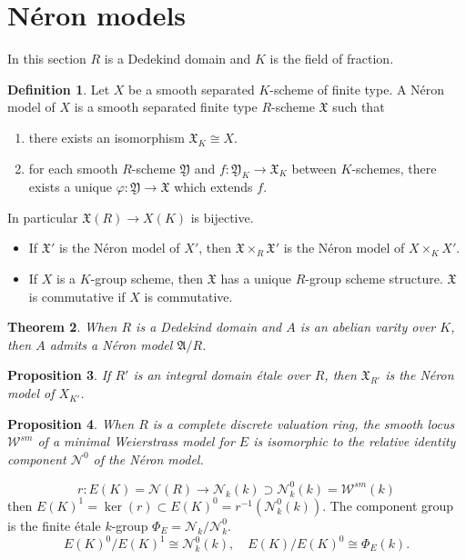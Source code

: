 \documentclass[leqno]{amsart}
\newcommand{\1}{\mathbf{1}}
\newtheorem{thm}{Theorem}[section]
\newtheorem{prop}[thm]{Proposition}
\theoremstyle{definition}
\newtheorem{defn}[thm]{Definition}
\theoremstyle{remark}
\begin{document}
\section{N\'{e}ron models}



In this  section $R$ is a Dedekind domain 
and  $K$ is the field of fraction.

\begin{defn}
	 Let $X$ be a smooth separated $K$-scheme of finite type.
	 A N\'{e}ron model of $X$ is a smooth separated finite type
	 $R$-scheme $\mathfrak{X}$ such that
	 \begin{enumerate}[label=(\alph*)]
		 \item there exists an isomorphism
			 $\mathfrak{X}_K\cong X$.
		 \item for each smooth $R$-scheme $\mathfrak{Y}$
		 and $f\colon\mathfrak{Y}_K\to \mathfrak{X}_K$
		 between  $K$-schemes, 
		 there exists a unique  
		 $\varphi\colon\mathfrak{Y}\to \mathfrak{X}$
		 which extends $f$.
	 \end{enumerate}
	 In particular $\mathfrak{X}(R)\to X(K)$
	 is bijective.
\end{defn}
\begin{itemize}
	\item If $\mathfrak{X}'$ is the N\'{e}ron model
		of $X'$, then
		$\mathfrak{X}\times_R\mathfrak{X}'$
		is the  N\'{e}ron model of $X\times_KX'$.
	\item If $X$ is a  $K$-group scheme,
		then  $\mathfrak{X}$ has a unique
		 $R$-group scheme structure.
		 $\mathfrak{X}$ is commutative if
		 $X$ is commutative.
\end{itemize}


\begin{thm}
	When $R$ is a Dedekind domain
	and  $A$ is an abelian varity over  $K$,
	then  $A$ admits a  N\'{e}ron model $\mathfrak{A}/R$.
\end{thm}

\begin{prop}
	If $R'$ is an integral domain \'{e}tale over $R$,
	then  $\mathfrak{X}_{R'}$ 
	is the N\'{e}ron model of $X_{K'}$.
\end{prop}

\begin{prop}
	When $R$ is a complete discrete valuation ring,
	the smooth locus  $\mathcal{W}^{sm}$ 
	of a minimal Weierstrass model for $E$
	is isomorphic to the relative identity component 
	$\mathcal{N}^0$ of the  N\'{e}ron model.
\end{prop}
\[
	r\colon E(K)=\mathcal{N}(R)\to
	\mathcal{N}_k(k)\supset \mathcal{N}^0_k(k)=
	\mathcal{W}^{sm}(k)
\]
then $E(K)^1=\ker(r)\subset E(K)^0=r^{-1}(\mathcal{N}^0_k(k))$.
The component group is the 
finite \'{e}tale $k$-group  $\Phi_E=\mathcal{N}_k/\mathcal{N}^0_k$.
\[
	E(K)^0/E(K)^1\cong \mathcal{N}^0_k(k),\quad
	E(K)/E(K)^0\cong \Phi_E(k).
\]
\end{document}

